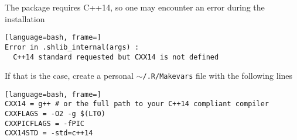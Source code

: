 The package requires C++14, so one may encounter an error during the
installation 
\begin{lstlisting}[language=bash, frame=]
Error in .shlib_internal(args) : 
  C++14 standard requested but CXX14 is not defined
\end{lstlisting}

If that is the case, create a personal {\tt $\sim$/.R/Makevars} file with
the following lines
\begin{lstlisting}[language=bash, frame=]
CXX14 = g++ # or the full path to your C++14 compliant compiler
CXXFLAGS = -O2 -g $(LTO)
CXXPICFLAGS = -fPIC
CXX14STD = -std=c++14
\end{lstlisting}


